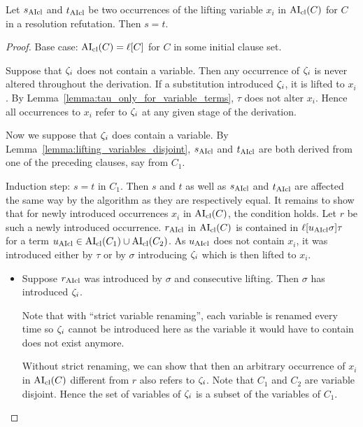 \documentclass[,%
	paper=a4,%
	DIV14, 
	liststotoc,
	bibtotoc,
	draft=false,%
	numbers=noendperiod
]{scrartcl}
\begin{document}
	\begin{lemma}
		\label{lemma:lifting_var_refers_to_same_terms}
		Let $s_{\operatorname{AIcl}}$ and $t_{\operatorname{AIcl}}$ be two occurrences of the lifting variable $x_i$ in $\operatorname{AI}_\mathrm{cl}(C)$ for $C$ in a resolution refutation.
		Then $s=t$.

	\end{lemma}
	\begin{proof}
		Base case: $\operatorname{AI}_\mathrm{cl}(C) = \ell[C]$ for $C$ in some initial clause set.

		Suppose that $\zeta_{i}$ does not contain a variable.
		Then any occurrence of $\zeta_{i}$ is never altered throughout the derivation.
		If a substitution introduced $\zeta_{i}$, it is lifted to $x_i$.
		By Lemma~\ref{lemma:tau_only_for_variable_terms}, $\tau$ does not alter $x_i$. 
		Hence all occurrences to $x_i$ refer to $\zeta_{i}$ at any given stage of the derivation.

		Now we suppose that $\zeta_{i}$ does contain a variable.
		By Lemma~\ref{lemma:lifting_variables_disjoint}, $s_{\operatorname{AIcl}}$ and $t_{\operatorname{AIcl}}$ are both derived from one of the preceding clauses, say from $C_1$. 

		Induction step: $s=t$ in $C_1$.
		Then $s$ and $t$ as well as $s_{\operatorname{AIcl}}$ and $t_{\operatorname{AIcl}}$ are affected the same way by the algorithm as they are respectively equal.
		It remains to show that for newly introduced occurrences $x_i$ in $\operatorname{AI}_\mathrm{cl}(C)$, the condition holds. Let $r$ be such a newly introduced occurrence.
		$r_{\operatorname{AIcl}}$ in $\operatorname{AI}_\mathrm{cl}(C)$ is contained in $\ell[u_{\operatorname{AIcl}}\sigma]\tau$ for a term $u_{\operatorname{AIcl}} \in \operatorname{AI}_\mathrm{cl}(C_1) \cup \operatorname{AI}_\mathrm{cl}(C_2)$.
		As $u_{\operatorname{AIcl}}$ does not contain $x_i$, it was introduced either by $\tau$ or by $\sigma$ introducing $\zeta_{i}$ which is then lifted to $x_i$.
		\begin{itemize}
			\item Suppose $r_{\operatorname{AIcl}}$ was introduced by $\sigma$ and consecutive lifting. 
				Then $\sigma$ has introduced $\zeta_{i}$.

				\mytodo{} Note that with ``strict variable renaming'', each variable is renamed every time so $\zeta_{i}$ cannot be introduced here as the variable it would have to contain does not exist anymore.

				Without strict renaming, we can show that then an arbitrary occurrence of $x_i$ in $\operatorname{AI}_\mathrm{cl}(C)$ different from $r$ also refers to $\zeta_{i}$.
				Note that $C_1$ and $C_2$ are variable disjoint.
				Hence the set of variables of $\zeta_{i}$ is a subset of the variables of $C_1$. 


\end{itemize}
\end{proof}
\end{document}
